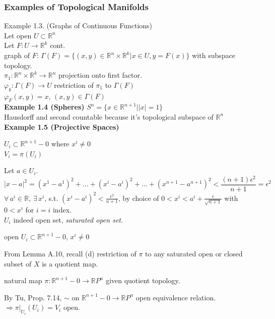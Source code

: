\documentclass[11pt]{amsart}
\theoremstyle{definition}
\begin{document}
\subsubsection*{Examples of Topological Manifolds}

Example 1.3. (Graphs of Continuous Functions) \\
Let open $U \subset \mathbb{R}^n$ \\
Let $F: U \to \mathbb{R}^k$ cont. \\
graph of $F$: $\Gamma(F) = \lbrace (x,y) \in \mathbb{R}^n \times \mathbb{R}^k | x \in U , y = F(x) \rbrace$ with subspace topology. \\
$\pi_1 : \mathbb{R}^n \times \mathbb{R}^k \to \mathbb{R}^n$ projection onto first factor. \\
$\varphi_k:\Gamma(F) \to U$ restriction of $\pi_1$ to $\Gamma(F)$ \\
$\varphi_F(x,y) = x$, $(x,y) \in \Gamma(F)$ \\

\textbf{Example 1.4 (Spheres)} $S^n = \lbrace x \in \mathbb{R}^{n+1} | |x| = 1 \rbrace$ \\
Hausdorff and second countable because it's topological subspace of $\mathbb{R}^n$   \\


\textbf{Example 1.5 (Projective Spaces)}

$U_i \subset \mathbb{R}^{n+1} - 0$ where $x^i \neq 0$  \\
$V_i = \pi(U_i)$

Let $a\in U_i$.
\[
|x-a|^2 = (x^1 - a^1)^2 + \dots + (x^i - a^i)^2 + \dots + (x^{n+1} - a^{n+1})^2 < \frac{ (n+1) \epsilon^2 }{ n + 1 } = \epsilon^2
\]
$\forall \, a^i \in \mathbb{R}$, $\exists \,  x^i$, s.t. $(x^i - a^i)^2 < \frac{ \epsilon^2}{ n +1}$, by choice of $0< x^i < a^i + \frac{ \epsilon}{ \sqrt{ n+ 1} }$ with $0<x^i$ for $i=i$ index.  \\
$U_i$ indeed open set, \emph{saturated open set}.

open $U_i \subset \mathbb{R}^{n+1} - 0$, $x^i \neq 0$

From Lemma A.10, recall
(d) restriction of $\pi$ to any saturated open or closed subset of $X$ is a quotient map.

natural map $\pi: \mathbb{R}^{n+1} - 0 \to \mathbb{R}P^n$ given quotient topology.

By Tu, Prop. 7.14, $\sim $ on $\mathbb{R}^{n+1} - 0  \to \mathbb{R}P^n$ open equivalence relation.  \\
$\Longrightarrow  \left. \pi \right|_{U_i}(U_i) = V_i$ open.
\end{document}
